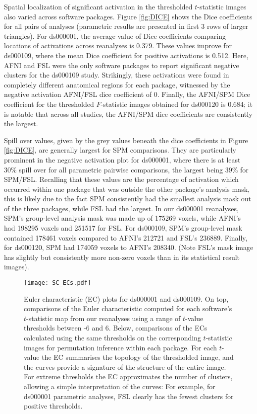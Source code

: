 Spatial localization of significant activation in the thresholded $t$-statistic images also varied across software packages. Figure \ref{fig:DICE} shows the Dice coefficients for all pairs of analyses (parametric results are presented in first 3 rows of larger triangles). For ds000001, the average value of Dice coefficients comparing locations of activations across reanalyses is 0.379. These values improve for ds000109, where the mean Dice coefficient for positive activations is 0.512. Here, AFNI and FSL were the only software packages to report significant negative clusters for the ds000109 study. Strikingly, these activations were found in completely different anatomical regions for each package, witnessed by the negative activation AFNI/FSL dice coefficient of 0. Finally, the AFNI/SPM Dice coefficient for the thresholded $F$-statistic images obtained for ds000120 is 0.684; it is notable that across all studies, the AFNI/SPM dice coefficients are consistently the largest.

Spill over values, given by the grey values beneath the dice coefficients in Figure \ref{fig:DICE}, are generally largest for SPM comparisons. They are particularly prominent in the negative activation plot for ds000001, where there is at least 30\% spill over for all parametric pairwise comparisons, the largest being 39\% for SPM/FSL. Recalling that these values are the percentage of activation which occurred within one package that was outside the other package's analysis mask, this is likely due to the fact SPM consistently had the smallest analysis mask out of the three packages, while FSL had the largest. In our ds000001 reanalyses, SPM's group-level analysis mask was made up of 175269 voxels, while AFNI's had 198295 voxels and 251517 for FSL.  For ds000109, SPM's group-level mask contained 178461 voxels compared to AFNI's 212721 and FSL's 236889. Finally, for ds000120, SPM had 174059 voxels to AFNI's 208340. (Note FSL's mask image has slightly but consistently more non-zero voxels than in its statistical result images).

\begin{sidewaysfigure}[htbp]
\centering
	\texttt{[image: SC\_ECs.pdf]}	
\caption{Euler characteristic (EC) plots for ds000001 and ds000109. On top, comparisons of the Euler characteristic computed for each software's $t$-statistic map from our reanalyses using a range of $t$-value thresholds between -6 and 6. Below, comparisons of the ECs calculated using the same thresholds on the corresponding $t$-statistic images for permutation inference within each package. For each $t$-value the EC summarises the topology of the thresholded image, and the curves provide a signature of the structure of the entire image. For extreme thresholds the EC approximates the number of clusters, allowing a simple interpretation of the curves: For example, for ds000001 parametric analyses, FSL clearly has the fewest clusters for positive thresholds.}
\label{fig:ECs}
\end{sidewaysfigure}


